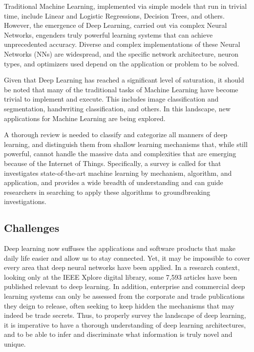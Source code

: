 \documentclass[12pt]{article}
\begin{document}
	Traditional Machine Learning, implemented via simple models that run in trivial time, include Linear and Logistic Regressions, Decision Trees, and others. However, the emergence of Deep Learning, carried out via complex Neural Networks, engenders truly powerful learning systems that can achieve unprecedented accuracy. Diverse and complex implementations of these Neural Networks (NNs) are widespread, and the specific network architecture, neuron types, and optimizers used depend on the application or problem to be solved.  
	
	Given that Deep Learning has reached a significant level of saturation, it should be noted that many of the traditional tasks of Machine Learning have become trivial to implement and execute. This includes image classification and segmentation, handwriting classification, and others. In this landscape, new applications for Machine Learning are being explored. 
	
	A thorough review is needed to classify and categorize all manners of deep learning, and distinguish them from shallow learning mechanisms that, while still powerful, cannot handle the massive data and complexities that are emerging because of the Internet of Things. Specifically, a survey is called for that investigates state-of-the-art machine learning by mechanism, algorithm, and application, and provides a wide breadth of understanding and can guide researchers in searching to apply these algorithms to groundbreaking investigations.
	
	\subsection{Challenges}\hspace{4ex} Deep learning now suffuses the applications and software products that make daily life easier and allow us to stay connected. Yet, it may be impossible to cover every area that deep neural networks have been applied. In a research context, looking only at the IEEE Xplore digital library, some 7,593 articles have been published relevant to deep learning. In addition, enterprise and commercial deep learning systems can only be assessed from the corporate and trade publications they deign to release, often seeking to keep hidden the mechanisms that may indeed be trade secrets. Thus, to properly survey the landscape of deep learning, it is imperative to have a thorough understanding of deep learning architectures, and to be able to infer and discriminate what information is truly novel and unique. \\
		
\end{document}
